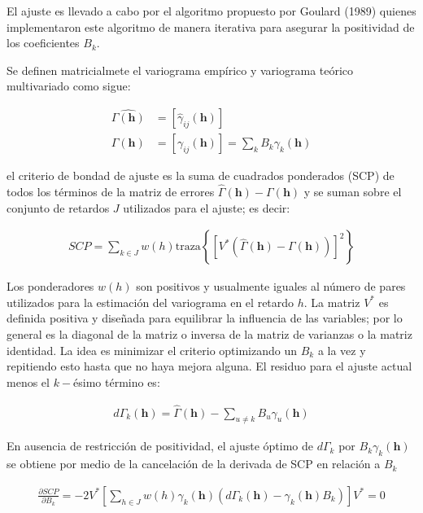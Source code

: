 \documentclass[
]{book}
\begin{document}
El ajuste es llevado a cabo por el algoritmo propuesto por Goulard (1989) quienes implementaron este algoritmo de manera iterativa para asegurar la positividad de los coeficientes \(B_k\).

Se definen matricialmete el variograma empírico y variograma teórico multivariado como sigue:

\begin{align}
    \hat{\Gamma(\textbf{h})}&=\left[\hat{\gamma}_{ij}(\textbf{h})\right]\\
    \Gamma(\textbf{h})&=\left[\gamma_{ij}(\textbf{h})\right]=\sum_kB_k\gamma_k(\textbf{h})
\end{align}

el criterio de bondad de ajuste es la suma de cuadrados ponderados (SCP) de todos los términos de la matriz de errores \(\hat{\Gamma}(\textbf{h})-\Gamma(\textbf{h})\) y se suman sobre el conjunto de retardos \(J\) utilizados para el ajuste; es decir:

\begin{align}
    SCP=\sum_{k\in J}w(h)\text{traza}\left\{ \left[V^{*}(\hat{\Gamma}(\textbf{h})-\Gamma(\textbf{h}))\right]^2\right\}
\end{align}

Los ponderadores \(w(h)\) son positivos y usualmente iguales al número de pares utilizados para la estimación del variograma en el retardo \(h\). La matriz \(V^{*}\) es definida positiva y diseñada para equilibrar la influencia de las variables; por lo general es la diagonal de la matriz o inversa de la matriz de varianzas o la matriz identidad. La idea es minimizar el criterio optimizando un \(B_k\) a la vez y repitiendo esto hasta que no haya mejora alguna. El residuo para el ajuste actual menos el \(k-\)ésimo término es:

\begin{align}
    d\Gamma_k(\textbf{h})=\hat{\Gamma}(\textbf{h})-\sum_{u\neq k}B_u\gamma_u(\textbf{h})
\end{align}

En ausencia de restricción de positividad, el ajuste óptimo de \(d\Gamma_k\) por \(B_k\gamma_k(\textbf{h})\) se obtiene por medio de la cancelación de la derivada de SCP en relación a \(B_k\)

\begin{align}
    \frac{\partial SCP}{\partial B_k}=-2V^{*}\left[ \sum_{h\in J}w(h)\gamma_k(\textbf{h})\left(d\Gamma_k(\textbf{h})-\gamma_k(\textbf{h})B_k\right)\right]V^{*}=0
\end{align}
\end{document}
